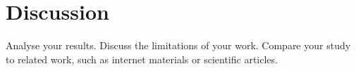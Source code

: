\section{Discussion}
\label{sec:discussion}

Analyse your results. Discuss the limitations of your work. Compare your study to related work, such as internet materials or scientific articles.